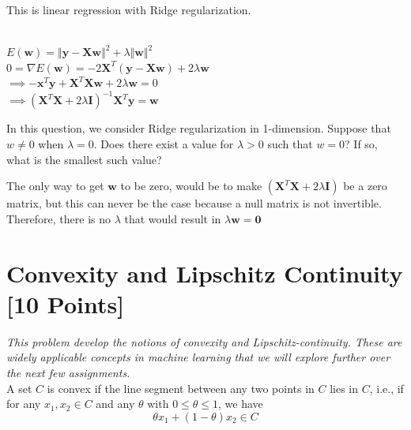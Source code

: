 This is linear regression with Ridge regularization.

\begin{subsolution}
  \\
  $ E(\mathbf{w}) = \Vert{\mathbf{y} - \mathbf{X}\mathbf{w}}\Vert^2 + \lambda\Vert\mathbf{w}\Vert^2$ \\
  $ 0 = \nabla{E(\mathbf{w})} = -2\mathbf{X}^T(\mathbf{y} - \mathbf{X}\mathbf{w}) + 2\lambda{\mathbf{w}}$ \\
  $\implies -\mathbf{x}^T\mathbf{y} + \mathbf{X}^T\mathbf{Xw} + 2\lambda\mathbf{w} = 0$
  \\ $\implies (\mathbf{X}^T\mathbf{X} + 2\lambda\mathbf{I})^{-1}\mathbf{X}^T\mathbf{y} = \mathbf{w}$ \\
\end{subsolution}

\subproblem In this question, we consider Ridge regularization in 1-dimension. Suppose that $w \neq 0$ when $\lambda = 0$. Does there exist a value for $\lambda > 0$ such that $w = 0$? If so, what is the smallest such value?

\begin{subsolution}
  The only way to get $\mathbf{w}$ to be zero, would be to make $(\mathbf{X}^T\mathbf{X} + 2\lambda\mathbf{I})$ be a zero matrix, but this can never be the case because a null matrix is not invertible. Therefore, there is no $\lambda$ that would result in $\lambda\mathbf{w} = \mathbf{0}$
\end{subsolution}


\newpage

\section{Convexity and Lipschitz Continuity [10 Points]}

\emph{This problem develop the notions of convexity and Lipschitz-continuity. These are widely applicable concepts in machine learning that we will explore further over the next few assignments.} \\

A set $C$ is convex if the line segment between any two points in $C$ lies in $C$, i.e.,
if for any $x_1, x_2 \in C$ and any $\theta$ with $0 \leq \theta \leq 1$, we have
\[\theta x_1  + (1 - \theta)x_2 \in C\]

